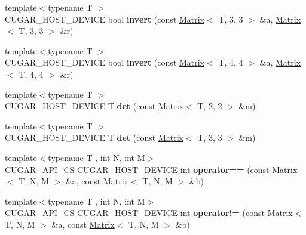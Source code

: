 \begin{DoxyCompactItemize}
\item 
\mbox{\label{namespacecugar_a8fa8ad2aa1eecff108a08135f38989c2}} 
{\footnotesize template$<$typename T $>$ }\\C\+U\+G\+A\+R\+\_\+\+H\+O\+S\+T\+\_\+\+D\+E\+V\+I\+CE bool {\bfseries invert} (const \hyperlink{structcugar_1_1_matrix}{Matrix}$<$ T, 3, 3 $>$ \&a, \hyperlink{structcugar_1_1_matrix}{Matrix}$<$ T, 3, 3 $>$ \&r)
\item 
\mbox{\label{namespacecugar_a846a19ea407e590179a8ceeb661e4bbf}} 
{\footnotesize template$<$typename T $>$ }\\C\+U\+G\+A\+R\+\_\+\+H\+O\+S\+T\+\_\+\+D\+E\+V\+I\+CE bool {\bfseries invert} (const \hyperlink{structcugar_1_1_matrix}{Matrix}$<$ T, 4, 4 $>$ \&a, \hyperlink{structcugar_1_1_matrix}{Matrix}$<$ T, 4, 4 $>$ \&r)
\item 
\mbox{\label{namespacecugar_a4275ecc9c8cac71b09c87b0006fb8e2a}} 
{\footnotesize template$<$typename T $>$ }\\C\+U\+G\+A\+R\+\_\+\+H\+O\+S\+T\+\_\+\+D\+E\+V\+I\+CE T {\bfseries det} (const \hyperlink{structcugar_1_1_matrix}{Matrix}$<$ T, 2, 2 $>$ \&m)
\item 
\mbox{\label{namespacecugar_aa0d58bc71417691423cfcf18de653010}} 
{\footnotesize template$<$typename T $>$ }\\C\+U\+G\+A\+R\+\_\+\+H\+O\+S\+T\+\_\+\+D\+E\+V\+I\+CE T {\bfseries det} (const \hyperlink{structcugar_1_1_matrix}{Matrix}$<$ T, 3, 3 $>$ \&m)
\item 
\mbox{\label{namespacecugar_abb191254ee5034bd690a934f9cfeda7a}} 
{\footnotesize template$<$typename T , int N, int M$>$ }\\C\+U\+G\+A\+R\+\_\+\+A\+P\+I\+\_\+\+CS C\+U\+G\+A\+R\+\_\+\+H\+O\+S\+T\+\_\+\+D\+E\+V\+I\+CE int {\bfseries operator==} (const \hyperlink{structcugar_1_1_matrix}{Matrix}$<$ T, N, M $>$ \&a, const \hyperlink{structcugar_1_1_matrix}{Matrix}$<$ T, N, M $>$ \&b)
\item 
\mbox{\label{namespacecugar_a8131502fe692007145d0fc5820332363}} 
{\footnotesize template$<$typename T , int N, int M$>$ }\\C\+U\+G\+A\+R\+\_\+\+A\+P\+I\+\_\+\+CS C\+U\+G\+A\+R\+\_\+\+H\+O\+S\+T\+\_\+\+D\+E\+V\+I\+CE int {\bfseries operator!=} (const \hyperlink{structcugar_1_1_matrix}{Matrix}$<$ T, N, M $>$ \&a, const \hyperlink{structcugar_1_1_matrix}{Matrix}$<$ T, N, M $>$ \&b)

\end{DoxyCompactItemize}
